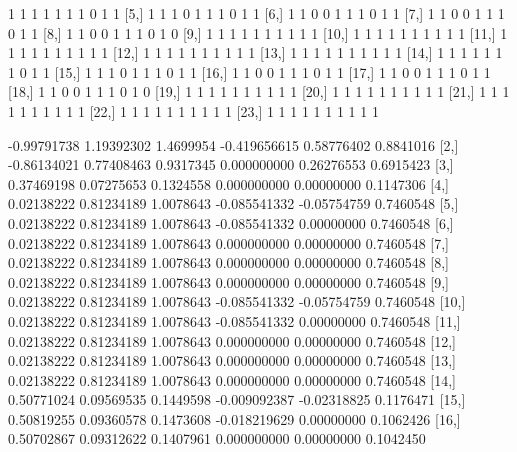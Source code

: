 \documentclass[a4paper]{article}
\begin{document}
\begin{Schunk}
\begin{Soutput}
 [4,]    1    1    1    1    1    1    1    0    1     1
 [5,]    1    1    1    0    1    1    1    0    1     1
 [6,]    1    1    0    0    1    1    1    0    1     1
 [7,]    1    1    0    0    1    1    1    0    1     1
 [8,]    1    1    0    0    1    1    1    0    1     0
 [9,]    1    1    1    1    1    1    1    1    1     1
[10,]    1    1    1    1    1    1    1    1    1     1
[11,]    1    1    1    1    1    1    1    1    1     1
[12,]    1    1    1    1    1    1    1    1    1     1
[13,]    1    1    1    1    1    1    1    1    1     1
[14,]    1    1    1    1    1    1    1    0    1     1
[15,]    1    1    1    0    1    1    1    0    1     1
[16,]    1    1    0    0    1    1    1    0    1     1
[17,]    1    1    0    0    1    1    1    0    1     1
[18,]    1    1    0    0    1    1    1    0    1     0
[19,]    1    1    1    1    1    1    1    1    1     1
[20,]    1    1    1    1    1    1    1    1    1     1
[21,]    1    1    1    1    1    1    1    1    1     1
[22,]    1    1    1    1    1    1    1    1    1     1
[23,]    1    1    1    1    1    1    1    1    1     1
\end{Soutput}
\begin{Soutput}
             [,1]       [,2]      [,3]         [,4]        [,5]      [,6]
 [1,] -0.99791738 1.19392302 1.4699954 -0.419656615  0.58776402 0.8841016
 [2,] -0.86134021 0.77408463 0.9317345  0.000000000  0.26276553 0.6915423
 [3,]  0.37469198 0.07275653 0.1324558  0.000000000  0.00000000 0.1147306
 [4,]  0.02138222 0.81234189 1.0078643 -0.085541332 -0.05754759 0.7460548
 [5,]  0.02138222 0.81234189 1.0078643 -0.085541332  0.00000000 0.7460548
 [6,]  0.02138222 0.81234189 1.0078643  0.000000000  0.00000000 0.7460548
 [7,]  0.02138222 0.81234189 1.0078643  0.000000000  0.00000000 0.7460548
 [8,]  0.02138222 0.81234189 1.0078643  0.000000000  0.00000000 0.7460548
 [9,]  0.02138222 0.81234189 1.0078643 -0.085541332 -0.05754759 0.7460548
[10,]  0.02138222 0.81234189 1.0078643 -0.085541332  0.00000000 0.7460548
[11,]  0.02138222 0.81234189 1.0078643  0.000000000  0.00000000 0.7460548
[12,]  0.02138222 0.81234189 1.0078643  0.000000000  0.00000000 0.7460548
[13,]  0.02138222 0.81234189 1.0078643  0.000000000  0.00000000 0.7460548
[14,]  0.50771024 0.09569535 0.1449598 -0.009092387 -0.02318825 0.1176471
[15,]  0.50819255 0.09360578 0.1473608 -0.018219629  0.00000000 0.1062426
[16,]  0.50702867 0.09312622 0.1407961  0.000000000  0.00000000 0.1042450

\end{Soutput}
\end{Schunk}
\end{document}

